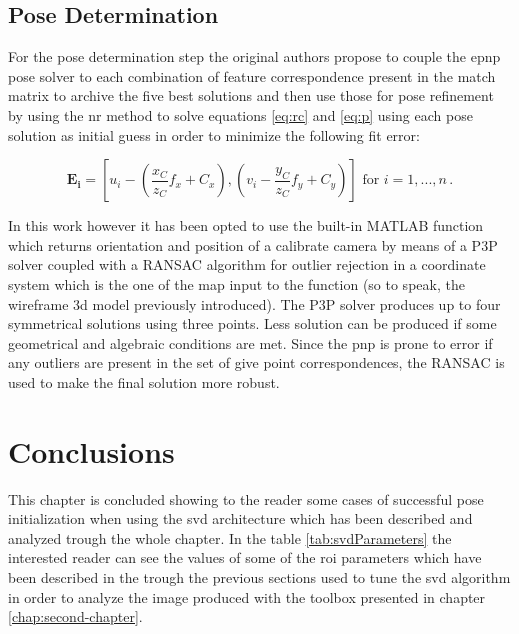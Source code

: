 \subsection{Pose Determination}
For the pose determination step the original authors propose to couple the e\acrshort{pnp} pose solver \cite{10.1007/s11263-008-0152-6} to each combination of feature correspondence present in the match matrix to archive the five best solutions and then use those for pose refinement by using the \acrshort{nr} method to solve equations \eqref{eq:rc} and \eqref{eq:p} using each pose solution as initial guess in order to minimize the following fit error:

\begin{equation}
  \mathbf{E_i} = \left[u_i - \left( \frac{x_C}{z_C} f_x + C_x \right) , \left( v_i - \frac{y_C}{z_C} f_y + C_y \right) \right]  \mbox{ for } i=1,...,n \,.
  \label{eq:errorFIT}
\end{equation}

In this work however it has been opted to use the built-in MATLAB function  which returns orientation and position of a calibrate camera by means of a P3P solver \cite{XiaoShanGao2003} coupled with a RANSAC algorithm for outlier rejection \cite{Torr2000} in a coordinate system which is the one of the map input to the function (so to speak, the wireframe \acrshort{3d} model previously introduced). The P3P solver produces up to four symmetrical solutions using three points. Less solution can be produced if some geometrical and algebraic conditions are met.
Since the \acrshort{pnp} is prone to error if any outliers are present in the set of give point correspondences, the RANSAC is used to make the final solution more robust.

\section{Conclusions}
This chapter is concluded showing to the reader some cases of successful pose initialization when using the \acrshort{svd} architecture which has been described and analyzed trough the whole chapter. In the table \ref{tab:svdParameters} the interested reader can see the values of some of the \acrshort{roi} parameters which have been described in the trough the previous sections used to tune the \acrshort{svd} algorithm in order to analyze the image produced with the toolbox presented in chapter \ref{chap:second-chapter}.

